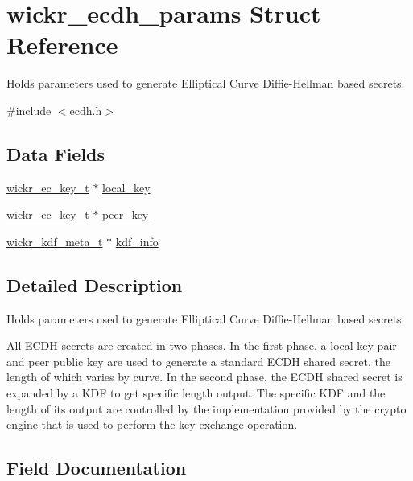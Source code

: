 \hypertarget{structwickr__ecdh__params}{}\section{wickr\+\_\+ecdh\+\_\+params Struct Reference}
\label{structwickr__ecdh__params}


Holds parameters used to generate Elliptical Curve Diffie-\/\+Hellman based secrets.  




{\ttfamily \#include $<$ecdh.\+h$>$}

\subsection*{Data Fields}
\begin{DoxyCompactItemize}
\item 
\hyperlink{structwickr__ec__key}{wickr\+\_\+ec\+\_\+key\+\_\+t} $\ast$ \hyperlink{structwickr__ecdh__params_aab5a55e6a516ab8268ef6739ae1422cd}{local\+\_\+key}
\item 
\hyperlink{structwickr__ec__key}{wickr\+\_\+ec\+\_\+key\+\_\+t} $\ast$ \hyperlink{structwickr__ecdh__params_ab17d6191b23fa7fd1befd03b2eee4ba9}{peer\+\_\+key}
\item 
\hyperlink{structwickr__kdf__meta}{wickr\+\_\+kdf\+\_\+meta\+\_\+t} $\ast$ \hyperlink{structwickr__ecdh__params_a0259f327ae0bdcc9e44b1d43a1216cac}{kdf\+\_\+info}
\end{DoxyCompactItemize}


\subsection{Detailed Description}
Holds parameters used to generate Elliptical Curve Diffie-\/\+Hellman based secrets. 

All E\+C\+DH secrets are created in two phases. In the first phase, a local key pair and peer public key are used to generate a standard E\+C\+DH shared secret, the length of which varies by curve. In the second phase, the E\+C\+DH shared secret is expanded by a K\+DF to get specific length output. The specific K\+DF and the length of it\textquotesingle{}s output are controlled by the implementation provided by the crypto engine that is used to perform the key exchange operation. 

\subsection{Field Documentation}
\mbox{\label{structwickr__ecdh__params_a0259f327ae0bdcc9e44b1d43a1216cac}} 
